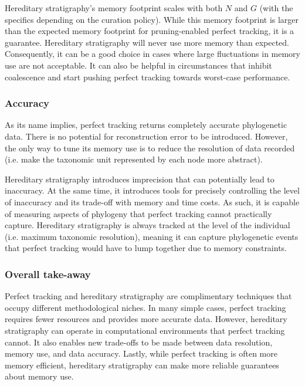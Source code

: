 Hereditary stratigraphy's memory footprint scales with both $N$ and $G$ (with the specifics depending on the curation policy).
While this memory footprint is larger than the expected memory footprint for pruning-enabled perfect tracking, it is a guarantee. 
Hereditary stratigraphy will never use more memory than expected.
Consequently, it can be a good choice in cases where large fluctuations in memory use are not acceptable.
It can also be helpful in circumstances that inhibit coalescence and start pushing perfect tracking towards worst-case performance.

\subsubsection{Accuracy}

As its name implies, perfect tracking returns completely accurate phylogenetic data. 
There is no potential for reconstruction error to be introduced.
However, the only way to tune its memory use is to reduce the resolution of data recorded (i.e. make the taxonomic unit represented by each node more abstract).

Hereditary stratigraphy introduces imprecision that can potentially lead to inaccuracy.
At the same time, it introduces tools for precisely controlling the level of inaccuracy and its trade-off with memory and time costs.
As such, it is capable of measuring aspects of phylogeny that perfect tracking cannot practically capture. 
Hereditary stratigraphy is always tracked at the level of the individual (i.e. maximum taxonomic resolution), meaning it can capture phylogenetic events that perfect tracking would have to lump together due to memory constraints.


\subsubsection{Overall take-away}

Perfect tracking and hereditary stratigraphy are complimentary techniques that occupy different methodological niches.
In many simple cases, perfect tracking requires fewer resources and provides more accurate data.
However, hereditary stratigraphy can operate in computational environments that perfect tracking cannot.
It also enables new trade-offs to be made between data resolution, memory use, and data accuracy.
Lastly, while perfect tracking is often more memory efficient, hereditary stratigraphy can make more reliable guarantees about memory use.

